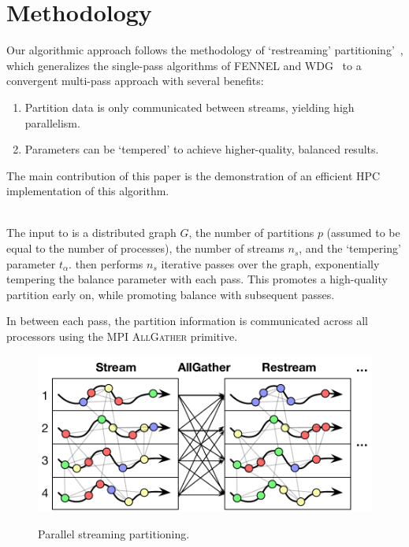 \section{Methodology}
Our algorithmic approach follows the methodology of `restreaming' partitioning'~\cite{nishimura2013restream}, which generalizes the single-pass algorithms of FENNEL and WDG~\cite{tsourakakis2012fennel,Stanton:2012:SGP:2339530.2339722} to a convergent multi-pass approach with several benefits:

\begin{enumerate}
\item Partition data is only communicated between streams, yielding high parallelism.
\item Parameters can be `tempered' to achieve higher-quality, balanced results.
\end{enumerate}

The main contribution of this paper is the demonstration of an efficient HPC implementation of this algorithm. 

\\
The input to \ourmethod is a distributed graph $G$, the number of partitions $p$ (assumed to be equal to the number of processes), the number of streams $n_s$, and the `tempering' parameter $t_\alpha$. \ourmethod then performs $n_s$ iterative passes over the graph, exponentially tempering the balance parameter with each pass. This promotes a high-quality partition early on, while promoting balance with subsequent passes. 

In between each pass, the partition information is communicated across all processors using the MPI \textsc{AllGather} primitive. 

\begin{figure}[ht]
\centering
  \includegraphics[width=1.0\columnwidth]{figures/restreamdiagram.pdf}
  \label{fig:coverfig}
  \caption{Parallel streaming partitioning.}
\end{figure}

